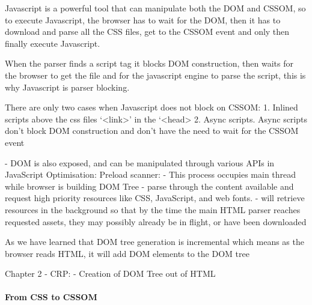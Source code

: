 Javascript is a powerful tool that can manipulate both the DOM and CSSOM, so to execute Javascript, the browser has to wait for the DOM, then it has to download and parse all the CSS files, get to the CSSOM event and only then finally execute Javascript.

When the parser finds a script tag it blocks DOM construction, then waits for the browser to get the file and for the javascript engine to parse the script, this is why Javascript is parser blocking.

There are only two cases when Javascript does not block on CSSOM:
1. Inlined scripts above the css files ‘<link>’ in the ‘<head>
2. Async scripts.
Async scripts don’t block DOM construction and don’t have the need to wait for the CSSOM event





- DOM is also exposed, and can be manipulated through various APIs in JavaScript
Optimisation: Preload scanner:
- This process occupies main thread while browser is building DOM Tree
- parse through the content available and request high priority resources like CSS, JavaScript, and web fonts.
- will retrieve resources in the background so that by the time the main HTML parser reaches requested assets, they may possibly already be in flight, or have been downloaded





As we have learned that DOM tree generation is incremental which means as the browser reads HTML, it will add DOM elements to the DOM tree






Chapter 2
- CRP:
- Creation of DOM Tree out of HTML




\paragraph{From CSS to CSSOM}

